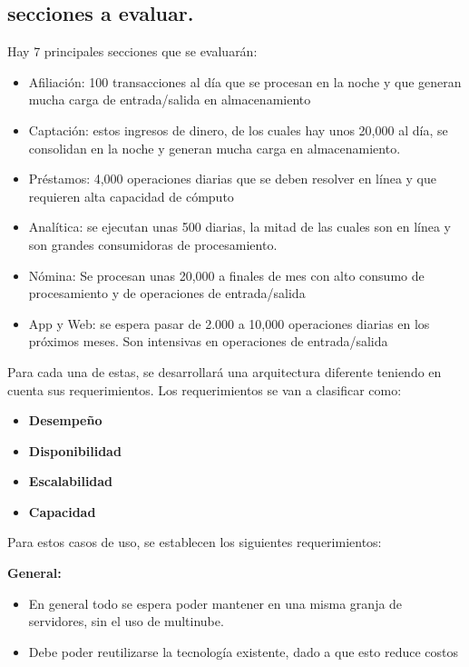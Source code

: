 \documentclass[a4paper]{article}
\begin{document}
\subsection{secciones a evaluar.}
Hay 7 principales secciones que se evaluarán:
\begin{itemize}
    \item Afiliación: 100 transacciones al día que se procesan en la noche y que generan mucha carga de
    entrada/salida en almacenamiento
    \item Captación: estos ingresos de dinero, de los cuales hay unos 20,000 al día, se consolidan en la noche y
    generan mucha carga en almacenamiento.
    \item Préstamos: 4,000 operaciones diarias que se deben resolver en línea y que requieren alta capacidad de
    cómputo
    \item Analítica: se ejecutan unas 500 diarias, la mitad de las cuales son en línea y son grandes consumidoras de
    procesamiento.
    \item Nómina: Se procesan unas 20,000 a finales de mes con alto consumo de procesamiento y de operaciones
    de entrada/salida
    \item App y Web: se espera pasar de 2.000 a 10,000 operaciones diarias en los próximos meses. Son intensivas
    en operaciones de entrada/salida
\end{itemize}

Para cada una de estas, se desarrollará una arquitectura diferente teniendo en cuenta sus requerimientos.
Los requerimientos se van a clasificar como:
\begin{itemize}
    \item \textbf{Desempeño}
    \item \textbf{Disponibilidad}
    \item \textbf{Escalabilidad}
    \item \textbf{Capacidad}
\end{itemize}

Para estos casos de uso, se establecen los siguientes requerimientos:

\textbf{General:}
\begin{itemize}
    \item En general todo se espera poder mantener en una misma granja de servidores, sin el uso de multinube.
    \item Debe poder reutilizarse la tecnología existente, dado a que esto reduce costos
\end{itemize} 
\end{document}
